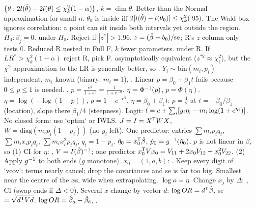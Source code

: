 \sk{} $\{\theta:2l(\hat{\theta})-2l(\theta)\le\chi^2_k(1-\alpha)\}$, $k=\dim\theta$. Better than the Normal approximation for small $n$. $\theta_0$ is inside iff $2[l(\hat{\theta})-l(\theta_0)]\le\chi^2_k(.95)$. The Wald box ignores correlation: a point can sit inside both intervals yet outside the region.
\sk{} $H_0:\beta_j=0$.  under $H_0$. Reject if $|z^*|>1.96$.
\sk{} $z=(\hat{\beta}-b_0)/\mathrm{se}$; R's $z$ column only tests 0.
\sk{} Reduced R nested in Full F, $k$ fewer parameters.  under R. If $LR^*>\chi^2_k(1-\alpha)$ reject R, pick F.
\sk{} asymptotically equivalent ($z^{*2}\approx\chi^2_1$), but the $\chi^2$ approximation to the LR is generally better, so .
\bx
{} $Y_i\sim\mathrm{bin}(m_i,p_i)$ independent, $m_i$ known (binary: $m_i=1$), . Linear $p=\beta_0+\beta_1t$ fails because $0\le p\le1$ is needed.
\sk{} , $p=\frac{e^\eta}{1+e^\eta}=\frac1{1+e^{-\eta}}$.  $\eta=\Phi^{-1}(p)$, $p=\Phi(\eta)$.  $\eta=\log(-\log(1-p))$, $p=1-e^{-e^\eta}$.
\sk{} $\eta=\beta_0+\beta_1t$: $p=\frac12$ at $t=-\beta_0/\beta_1$ (location), slope there $\beta_1/4$ (steepness).
Logit: $l=c+\sum_{i}[y_i\eta_i-m_i\log(1+e^{\eta_i})]$. No closed form: use `optim` or IWLS.
\sk{} $J=I=X^{\mathsf T} WX$, $W=\mathrm{diag}(m_ip_i(1-p_i))$ (no $y_i$ left). One predictor: entries $\sum m_ip_iq_i$, $\sum m_ix_ip_iq_i$, $\sum m_ix_i^2p_iq_i$, $q_i=1-p_i$.
\sk{} $\hat{\eta}_0=x_0^{\mathsf T}\hat{\beta}$, $\hat p_0=g^{-1}(\hat{\eta}_0)$.
\sk{} $p$ is not linear in $\beta$, so (1) CI for $\eta$: , $V=I(\hat{\beta})^{-1}$; one predictor $x_0^{\mathsf T} Vx_0=V_{11}+2x_0V_{12}+x_0^2V_{22}$. (2) Apply $g^{-1}$ to both ends ($g$ monotone).
\sk{} $x_0=(1,a,b)$: . Keep every digit of `vcov`: terms nearly cancel; drop the covariances and se is far too big. Smallest near the centre of the $x$s, wide when extrapolating.
\sk{} $\log o=\eta$. Change $x_j$ by $\Delta$: , CI  (swap ends if $\Delta<0$). Several $x$ change by vector $d$: $\log OR=d^{\mathsf T}\hat{\beta}$, se $=\sqrt{d^{\mathsf T} Vd}$.
\sk{} $\log OR=\hat{\beta}_a-\hat{\beta}_b$, .
